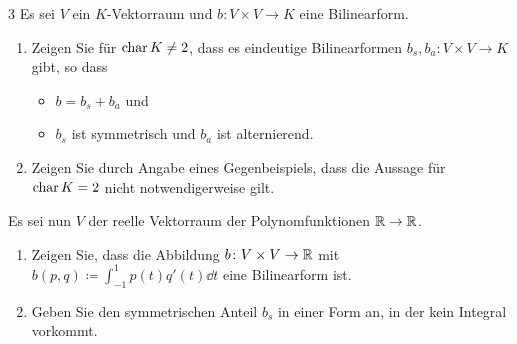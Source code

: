 \begin{question}[subtitle = Zerlegung einer Bilinearform in symmetrischen und alternierenden Teil]{3}
   Es sei $V$ ein $K$-Vektorraum und $b \colon V \times V \to K$ eine Bilinearform.
  \begin{enumerate}[leftmargin=*]
    \item
      Zeigen Sie für $\operatorname{char} K \neq 2$, dass es eindeutige Bilinearformen $b_s, b_a \colon V \times V \to K$ gibt, so dass
      \begin{itemize}
        \item
          $b = b_s + b_a$ und
        \item
          $b_s$ ist symmetrisch und $b_a$ ist alternierend.
      \end{itemize}
    \item
      Zeigen Sie durch Angabe eines Gegenbeispiels, dass die Aussage für $\operatorname{char} K = 2$ nicht notwendigerweise gilt.
  \end{enumerate}
  Es sei nun $V$ der reelle Vektorraum der Polynomfunktionen $\mathbb{R} \to \mathbb{R}$.
  \begin{enumerate}[leftmargin=*, resume]
    \item
      Zeigen Sie, dass die Abbildung $b \colon V \times V \to \mathbb{R}$ mit $b(p, q) \coloneqq \int_{-1}^1 p(t) q'(t) \dd{t}$ eine Bilinearform ist.
    \item
      Geben Sie den symmetrischen Anteil $b_s$ in einer Form an, in der kein Integral vorkommt.
  \end{enumerate}
\end{question}


